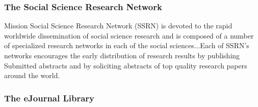 \documentclass[xcolor=dvipsnames, 9pt]{beamer}
\begin{document}
\begin{frame}[fragile]
    \frametitle{The Social Science Research Network}
    \begin{block}{Mission}
        Social Science Research Network (SSRN) is devoted to the rapid worldwide dissemination of social science research and is composed of a number of specialized research networks in each of the social sciences...Each of SSRN's networks encourages the early distribution of research results by publishing Submitted abstracts and by soliciting abstracts of top quality research papers around the world.
    \end{block}
\end{frame}

\begin{frame}[fragile]
    \frametitle{The eJournal Library}
\end{frame}
\end{document}
